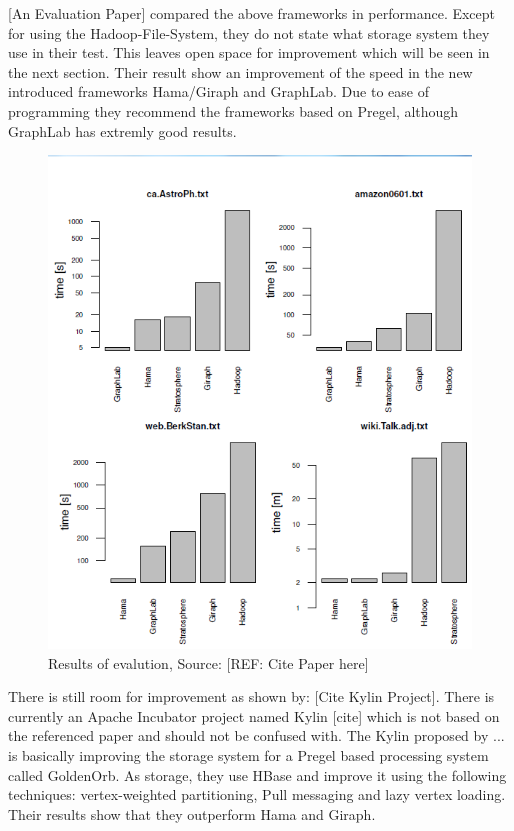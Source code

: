 \documentclass{acm_proc_article-sp}
\begin{document}
[An Evaluation Paper] compared the above frameworks in performance. Except for using the Hadoop-File-System, they do not state what storage system they use in their test. This leaves open space for improvement which will be seen in the next section. Their result show an improvement of the speed in the new introduced frameworks Hama/Giraph and GraphLab. Due to ease of programming they recommend the frameworks based on Pregel, although GraphLab has extremly good results.

\begin{figure}[hbtp]
	\centering
	\includegraphics[scale=0.5]{results_four.png}
	\caption{Results of evalution, Source: [REF: Cite Paper here]}
\end{figure}

There is still room for improvement as shown by: [Cite Kylin Project]. There is currently an Apache Incubator project named Kylin [cite] which is not based on the referenced paper and should not be confused with. The Kylin proposed by ... is basically improving the storage system for a Pregel based processing system called GoldenOrb. As storage, they use HBase and improve it using the following techniques: vertex-weighted partitioning, Pull messaging and lazy vertex loading. Their results show that they outperform Hama and Giraph.
\end{document}
